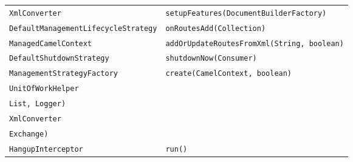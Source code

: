 \begin{center}
\begin{longtable}{ll}
\lstinline/XmlConverter/&{\lstinline/setupFeatures(DocumentBuilderFactory)/}\\
\lstinline/DefaultManagementLifecycleStrategy/&{\lstinline/onRoutesAdd(Collection)/}\\
\lstinline/ManagedCamelContext/&{\lstinline/addOrUpdateRoutesFromXml(String, boolean)/}\\
\lstinline/DefaultShutdownStrategy/&{\lstinline/shutdownNow(Consumer)/}\\
\lstinline/ManagementStrategyFactory/&{\lstinline/create(CamelContext, boolean)/}\\
\lstinline/UnitOfWorkHelper/&\raisebox{-13pt}{\shortstack{\lstinline/afterRouteSynchronizations(Route, Exchange,/\\\lstinline/List, Logger)/}}\\
\lstinline/XmlConverter/&\raisebox{-13pt}{\shortstack{\lstinline/toSAXSourceFromStream(StreamSource,/\\\lstinline/Exchange)/}}\\
\lstinline/HangupInterceptor/&{\lstinline/run()/}\\
\end{longtable}
\end{center}

